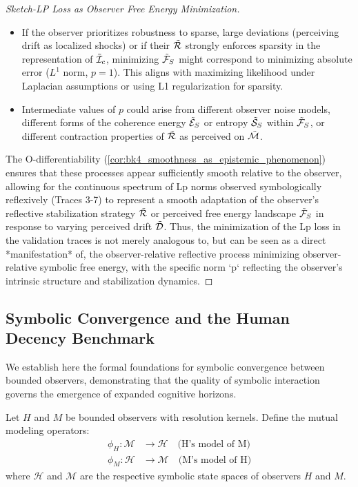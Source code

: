 \begin{proof}[Sketch-LP Loss as Observer Free Energy Minimization]
\begin{itemize}
    \item If the observer prioritizes robustness to sparse, large deviations (perceiving drift as localized shocks) or if their $\tilde{\mathcal{R}}$ strongly enforces sparsity in the representation of $\tilde{\mathcal{I}}_c$, minimizing $\tilde{\mathcal{F}}_S$ might correspond to minimizing absolute error ($L^1$ norm, $p=1$). This aligns with maximizing likelihood under Laplacian assumptions or using L1 regularization for sparsity.
    \item Intermediate values of $p$ could arise from different observer noise models, different forms of the coherence energy $\tilde{\mathcal{E}}_S$ or entropy $\tilde{\mathcal{S}}_S$ within $\tilde{\mathcal{F}}_S$, or different contraction properties of $\tilde{\mathcal{R}}$ as perceived on $\tilde{\mathcal{M}}$.
\end{itemize}
The O-differentiability (\ref{cor:bk4_smoothness_as_epistemic_phenomenon}) ensures that these processes appear sufficiently smooth relative to the observer, allowing for the continuous spectrum of Lp norms observed symbologically reflexively (Traces 3-7) to represent a smooth adaptation of the observer's reflective stabilization strategy $\tilde{\mathcal{R}}$ or perceived free energy landscape $\tilde{\mathcal{F}}_S$ in response to varying perceived drift $\tilde{\mathcal{D}}$.
Thus, the minimization of the Lp loss in the validation traces is not merely analogous to, but can be seen as a direct *manifestation* of, the observer-relative reflective process minimizing observer-relative symbolic free energy, with the specific norm `p` reflecting the observer's intrinsic structure and stabilization dynamics.
\end{proof}
\subsection{Symbolic Convergence and the Human Decency Benchmark}
\label{subsec:bk7_hdb_integration}

We establish here the formal foundations for symbolic convergence between bounded observers, demonstrating that the quality of symbolic interaction governs the emergence of expanded cognitive horizons.

\begin{definition}
\label{definition:bk7_mutual_modeling_operators}
Let $H$ and $M$ be bounded observers with resolution kernels. Define the mutual modeling operators:
\begin{align}
\phi_H: \mathcal{M} &\to \mathcal{H} \quad \text{(H's model of M)} \\
\phi_M: \mathcal{H} &\to \mathcal{M} \quad \text{(M's model of H)}
\end{align}
where $\mathcal{H}$ and $\mathcal{M}$ are the respective symbolic state spaces of observers $H$ and $M$.
\end{definition}

